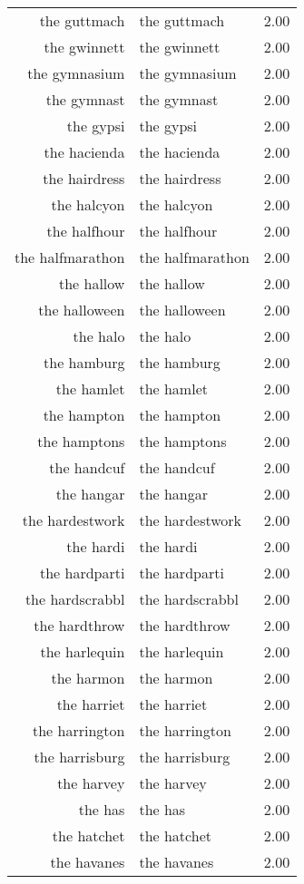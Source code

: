 \begin{table}[ht]
\begin{tabular}{rlr}
  the guttmach & the guttmach & 2.00 \\ 
  the gwinnett & the gwinnett & 2.00 \\ 
  the gymnasium & the gymnasium & 2.00 \\ 
  the gymnast & the gymnast & 2.00 \\ 
  the gypsi & the gypsi & 2.00 \\ 
  the hacienda & the hacienda & 2.00 \\ 
  the hairdress & the hairdress & 2.00 \\ 
  the halcyon & the halcyon & 2.00 \\ 
  the halfhour & the halfhour & 2.00 \\ 
  the halfmarathon & the halfmarathon & 2.00 \\ 
  the hallow & the hallow & 2.00 \\ 
  the halloween & the halloween & 2.00 \\ 
  the halo & the halo & 2.00 \\ 
  the hamburg & the hamburg & 2.00 \\ 
  the hamlet & the hamlet & 2.00 \\ 
  the hampton & the hampton & 2.00 \\ 
  the hamptons & the hamptons & 2.00 \\ 
  the handcuf & the handcuf & 2.00 \\ 
  the hangar & the hangar & 2.00 \\ 
  the hardestwork & the hardestwork & 2.00 \\ 
  the hardi & the hardi & 2.00 \\ 
  the hardparti & the hardparti & 2.00 \\ 
  the hardscrabbl & the hardscrabbl & 2.00 \\ 
  the hardthrow & the hardthrow & 2.00 \\ 
  the harlequin & the harlequin & 2.00 \\ 
  the harmon & the harmon & 2.00 \\ 
  the harriet & the harriet & 2.00 \\ 
  the harrington & the harrington & 2.00 \\ 
  the harrisburg & the harrisburg & 2.00 \\ 
  the harvey & the harvey & 2.00 \\ 
  the has & the has & 2.00 \\ 
  the hatchet & the hatchet & 2.00 \\ 
  the havanes & the havanes & 2.00 \\ 

\end{tabular}
\end{table}
